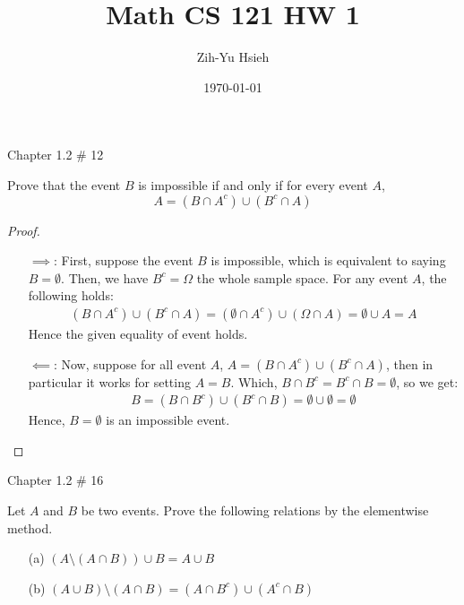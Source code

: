 \documentclass{article}
\title{Math CS 121 HW 1}
\author{Zih-Yu Hsieh}
\date{\today}
\begin{document}
\maketitle

\begin{ques}\label{q1}
    Chapter 1.2 \# 12

    Prove that the event $B$ is impossible if and only if for every event $A$,
    $$A=(B\cap A^c)\cup (B^c\cap A)$$ 
\end{ques}

\begin{proof}
    \begin{itemize}
        \item[$\implies$:] First, suppose the event $B$ is impossible, which is equivalent to saying $B=\emptyset$. Then, we have $B^c = \Omega$ the whole sample space. For any event $A$, the following holds:
        \begin{align}
            (B\cap A^c)\cup (B^c\cap A) = (\emptyset \cap A^c) \cup (\Omega \cap A) = \emptyset \cup A = A
        \end{align}
        Hence the given equality of event holds.

        \item[$\impliedby$:] Now, suppose for all event $A$, $A=(B \cap A^c)\cup (B^c\cap A)$, then in particular it works for setting $A=B$. Which, $B \cap B^c=B^c\cap B=\emptyset$, so we get:
        \begin{align}
            B=(B\cap B^c)\cup(B^c\cap B) = \emptyset\cup\emptyset = \emptyset
        \end{align}
        Hence, $B=\emptyset$ is an impossible event.
    \end{itemize}
\end{proof}

\hfil

\begin{ques}\label{q2}
    Chapter 1.2 \# 16

    Let $A$ and $B$ be two events. Prove the following relations by the elementwise method.
    \begin{itemize}
        \item[(a)] $(A\setminus (A\cap B))\cup B = A\cup B$
        \item[(b)] $(A\cup B)\setminus (A\cap B) = (A\cap B^c)\cup (A^c\cap B)$ 
    \end{itemize}
\end{ques}
\end{document}
